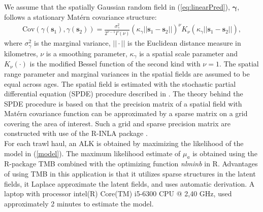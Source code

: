 \documentclass[a4paper 12pt]{article}
\numberwithin{equation}{section}
\begin{document}
\indent We assume that the spatially Gaussian random field in (\ref{eq:linearPred}), $\pmb{\gamma}$, follows a stationary Mat\'{e}rn covariance structure:
\begin{align}\label{eq:matern}
 \text{Cov}(\gamma(\mathbf{s}_1),\gamma(\mathbf{s}_2)) = \frac{\sigma^2_{\gamma}}{2^{\nu-1}\Gamma(\nu)}(\kappa_{\gamma}||\mathbf{s}_1 -\mathbf{s}_2||)^{\nu}K_{\nu}(\kappa_{\gamma}||\mathbf{s}_1-\mathbf{s}_2||),
\end{align}
where $\sigma^2_{\gamma}$ is the marginal variance, $||\cdot||$ is the Euclidean distance measure in kilometres, $\nu$ is a smoothing parameter, $\kappa_{\gamma}$ is a spatial scale parameter and $K_{\nu}(\cdot)$ is the modified Bessel function of the second kind with $\nu = 1$. The spatial range parameter and marginal variances in the spatial fields are assumed to be equal across ages. The spatial field is estimated with the stochastic partial differential equation (SPDE) procedure described in \citet{lindgren2011explicit}. The theory behind the SPDE procedure is based on that the precision matrix of a spatial field with Mat\'{e}rn  covariance function can be approximated by a sparse matrix on a grid covering the area of interest. Such a grid and sparse precision matrix are constructed with use of the R-INLA package \citep{rue2009approximate}.\\
\indent For each trawl haul, an ALK is obtained by maximizing the likelihood of the model in (\ref{model}). The maximum likelihood estimate of ${\mu}_{a}$  is obtained using the R-package TMB \citep{kristensen2015tmb} combined with the optimizing function \textit{nlminb} in R. Advantages of using TMB in this application is that it utilizes sparse structures in the latent fields, it Laplace approximate the latent fields, and uses automatic derivation. A laptop with  processor intel(R) Core(TM) i5-6300 CPU @ 2,40 GHz, used approximately 2 minutes to estimate the model. \\ 

\end{document}
